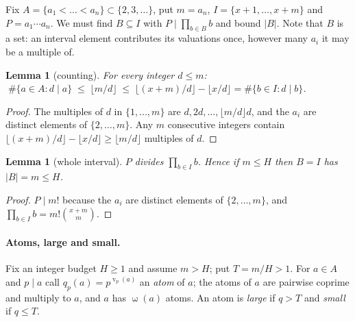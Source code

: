 \documentclass[11pt]{article}
\newtheorem{lemma}[theorem]{Lemma}
\theoremstyle{definition}
\DeclareMathOperator{\vp}{v}
\DeclareMathOperator{\om}{\omega}
\begin{document}
Fix $A=\{a_1<\dots<a_n\}\subset\{2,3,\dots\}$, put $m=a_n$, $I=\{x+1,\dots,x+m\}$ and $P=a_1\cdots a_n$.
We must find $B\subseteq I$ with $P\mid\prod_{b\in B}b$ and bound $|B|$. Note that $B$ is a set: an interval
element contributes its valuations once, however many $a_i$ it may be a multiple of.

\begin{lemma}[counting]\label{lem:count}
For every integer $d\le m$: $\;\#\{a\in A: d\mid a\}\;\le\;\lfloor m/d\rfloor\;\le\;\lfloor (x+m)/d\rfloor-\lfloor x/d\rfloor=\#\{b\in I: d\mid b\}$.
\end{lemma}
\begin{proof}
The multiples of $d$ in $\{1,\dots,m\}$ are $d,2d,\dots,\lfloor m/d\rfloor d$, and the $a_i$ are distinct
elements of $\{2,\dots,m\}$. Any $m$ consecutive integers contain
$\lfloor (x+m)/d\rfloor-\lfloor x/d\rfloor\ge\lfloor m/d\rfloor$ multiples of $d$.
\end{proof}

\begin{lemma}[whole interval]\label{lem:whole}
$P$ divides $\prod_{b\in I}b$. Hence if $m\le H$ then $B=I$ has $|B|=m\le H$.
\end{lemma}
\begin{proof}
$P\mid m!$ because the $a_i$ are distinct elements of $\{2,\dots,m\}$, and
$\prod_{b\in I}b=m!\binom{x+m}{m}$.
\end{proof}

\paragraph{Atoms, large and small.}
Fix an integer budget $H\ge 1$ and assume $m>H$; put $T=m/H>1$. For $a\in A$ and $p\mid a$ call
$q_p(a)=p^{\vp_p(a)}$ an \emph{atom} of $a$; the atoms of $a$ are pairwise coprime and multiply to $a$, and
$a$ has $\om(a)$ atoms. An atom is \emph{large} if $q>T$ and \emph{small} if $q\le T$.
\end{document}
